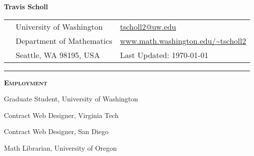 \documentclass[12pt]{article}
\newcommand{\sectionheading}[1]
{
\bigskip %
\noindent
\hspace{-6.5mm}\textcolor{Gray}{\rule[.75mm]{21.5mm}{1mm}} %
\hspace{.2mm}	%
{\large{\textbf{\textsc{#1}}}} %
}
\newenvironment{date_section}
	{
	\vspace{-1ex}
	\leftmargini = 15ex
		\begin{itemize}[
			labelsep = *,
			labelwidth = 9ex,
			labelindent = 0ex,
			itemindent = !,
			font=\normalfont,
			align=parleft
		]{}
		\itemsep=-1.5mm
	}
	{\end{itemize}\vspace{-2ex}}
\newcommand{\yearrange}[2]{
	\item[
		{\makebox[1ex][r]{#1}}
		--
		{\makebox[1ex][l]{#2} }
		] }
\begin{document}

	\thispagestyle{empty}

	\centerline{{\LARGE \textbf{Travis Scholl}}}

	\vspace{3mm}

	\begin{center}
		\begin{tabular}[c]{lll} %
			\phantom{aaaaaaaaa} %
			& University of Washington
				& \url{tscholl2@uw.edu} \\
 			& Department of Mathematics
				& \url{www.math.washington.edu/~tscholl2}\\
 			& Seattle, WA 98195, USA
				& Last Updated: \today
		\end{tabular}
	\end{center}


	\sectionheading{Employment}%

		\begin{date_section}

			\yearrange{2013}{} Graduate Student,  University of Washington

			\yearrange{2015}{2015} Contract Web Designer, Virginia Tech

			\yearrange{2013}{2014} Contract Web Designer, San Diego

			\yearrange{2012}{2013} Math Librarian, University of Oregon






		\end{date_section}
\end{document}
